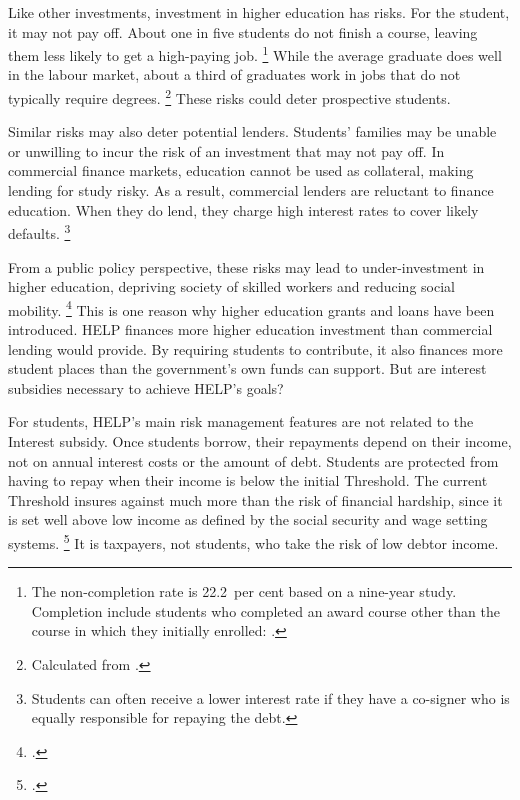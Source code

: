 \documentclass[embargoed]{grattan}
\begin{document}
Like other investments, investment in higher education has risks.
For the student, it may not pay off.
About one in five students do not finish a course, leaving them less likely to get a high-paying job.%
\footnote{The non-completion rate is 22.2~per cent based on a nine-year study.
Completion include students who completed an award course other than the course in which they initially enrolled: \textcite{Education2015Completionratesdomestic}.} 
While the average graduate does well in the labour market, about a third of graduates work in jobs that do not typically require degrees.%
\footnote{Calculated from \textcite[][Table~10]{ABS2015Educationwork2015}.} 
These risks could deter prospective students.

Similar risks may also deter potential lenders.
Students' families may be unable or unwilling to incur the risk of an investment that may not pay off.
In commercial finance markets, education cannot be used as collateral, making lending for study risky.
As a result, commercial lenders are reluctant to finance education.
When they do lend, they charge high interest rates to cover likely defaults.%
\footnote{Students can often receive a lower interest rate if they have a co-signer who is equally responsible for repaying the debt.}

From a public policy perspective, these risks may lead to under-investment in higher education, depriving society of skilled workers and reducing social mobility.%
\footcite[][Section~2.5]{Chapman2006Governmentmanagingrisk} 
This is one reason why higher education grants and loans have been introduced.
\gls{HELP} finances more higher education investment than commercial lending would provide.
By requiring students to contribute, it also finances more student places than the government's own funds can support.
But are interest subsidies necessary to achieve \gls{HELP}'s goals?

For students, \gls{HELP}'s main risk management features are not related to the \gls{Interest subsidy}.
Once students borrow, their repayments depend on their income, not on annual interest costs or the amount of debt.
Students are protected from having to repay when their income is below the initial \gls{Threshold}.
The current \gls{Threshold} insures against much more than the risk of financial hardship, since it is set well above low income as defined by the social security and wage setting systems.%
\footcite[][Chapter~4]{Norton2016HELPfuturefairer} 
It is taxpayers, not students, who take the risk of low debtor income.
\end{document}
